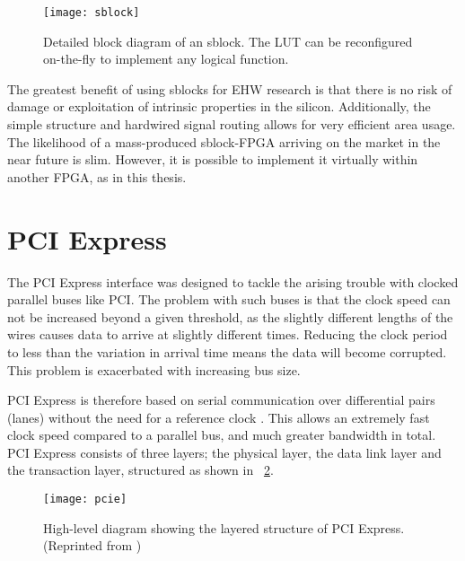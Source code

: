\begin{figure}[!ht]
    \centering
    \texttt{[image: sblock]}
    \caption[Sblock]{
        Detailed block diagram of an sblock.
        The LUT can be reconfigured on-the-fly to implement any logical function.
    }
    \label{fig:sblock}
\end{figure}

The greatest benefit of using sblocks for EHW research is that there is no risk of damage or exploitation of intrinsic properties in the silicon.
Additionally, the simple structure and hardwired signal routing allows for very efficient area usage.
The likelihood of a mass-produced sblock-FPGA arriving on the market in the near future is slim.
However, it is possible to implement it virtually within another FPGA, as in this thesis.


\section{PCI Express}

The PCI Express interface was designed to tackle the arising trouble with clocked parallel buses like PCI.
The problem with such buses is that the clock speed can not be increased beyond a given threshold, as the slightly different lengths of the wires causes data to arrive at slightly different times.
Reducing the clock period to less than the variation in arrival time means the data will become corrupted.
This problem is exacerbated with increasing bus size.

PCI Express is therefore based on serial communication over differential pairs (lanes\footnotemark) without the need for a reference clock \cite{pcie}.
This allows an extremely fast clock speed compared to a parallel bus, and much greater bandwidth in total.
PCI Express consists of three layers; the physical layer, the data link layer and the transaction layer, structured as shown in \figurename~\ref{fig:pcie}.

\begin{figure}[!ht]
    \centering
    \texttt{[image: pcie]}
    \caption[PCI Express structure]{
        High-level diagram showing the layered structure of PCI Express. (Reprinted from \cite{pcie})
    }
    \label{fig:pcie}
\end{figure}

